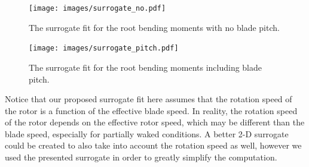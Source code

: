 \documentclass[11pt,letterpaper]{article}
\begin{document}
\begin{figure}
    \centering
    \texttt{[image: images/surrogate\_no.pdf]}
    \caption{The surrogate fit for the root bending moments with no blade pitch.}
    \label{fits}
\end{figure}
% 
\begin{figure}
    \centering
    \texttt{[image: images/surrogate\_pitch.pdf]}
    \caption{The surrogate fit for the root bending moments including blade pitch.}
    \label{fits_pitch}
\end{figure}

Notice that our proposed surrogate fit here assumes that the rotation speed of the rotor is a function of the effective blade speed. In reality, the rotation speed of the rotor depends on the effective rotor speed, which may be different than the blade speed, especially for partially waked conditions. A better 2-D surrogate could be created to also take into account the rotation speed as well, however we used the presented surrogate in order to greatly simplify the computation.
\end{document}
